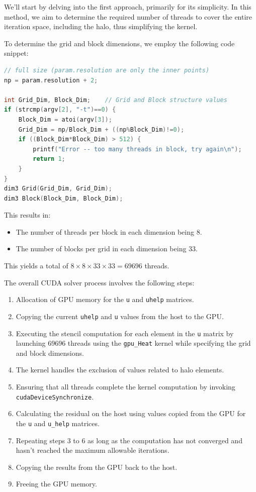 \documentclass[titlepage]{article}
\newcommand{\incode}[1]{\lstinline[style=inlineC,language=C]{#1}}
\begin{document}
We'll start by delving into the first approach, primarily for its simplicity. In this method, we aim to determine the required number of threads to cover the entire iteration space, including the halo, thus simplifying the kernel.

To determine the grid and block dimensions, we employ the following code snippet:

\begin{lstlisting}[style=c, language=C, caption=Grid and block dimension calculation, captionpos=b]
// full size (param.resolution are only the inner points)
np = param.resolution + 2;

int Grid_Dim, Block_Dim;    // Grid and Block structure values
if (strcmp(argv[2], "-t")==0) {
    Block_Dim = atoi(argv[3]);
    Grid_Dim = np/Block_Dim + ((np%Block_Dim)!=0);
    if ((Block_Dim*Block_Dim) > 512) {
        printf("Error -- too many threads in block, try again\n");
        return 1;
    }
}
dim3 Grid(Grid_Dim, Grid_Dim);
dim3 Block(Block_Dim, Block_Dim);
\end{lstlisting}

This results in:

\begin{itemize}
    \item The number of threads per block in each dimension being 8.
    \item The number of blocks per grid in each dimension being 33.
\end{itemize}

This yields a total of $8 \times 8 \times 33 \times 33 = 69696$ threads.

The overall CUDA solver process involves the following steps:

\begin{enumerate}
    \item Allocation of GPU memory for the \incode{u} and \incode{uhelp} matrices.
    \item Copying the current \incode{uhelp} and \incode{u} values from the host to the GPU.
    \item Executing the stencil computation for each element in the \incode{u} matrix by launching 69696 threads using the \incode{gpu_Heat} kernel while specifying the grid and block dimensions.
    \item The kernel handles the exclusion of values related to halo elements.
    \item Ensuring that all threads complete the kernel computation by invoking \incode{cudaDeviceSynchronize}.
    \item Calculating the residual on the host using values copied from the GPU for the \incode{u} and \incode{u_help} matrices.
    \item Repeating steps 3 to 6 as long as the computation has not converged and hasn't reached the maximum allowable iterations.
    \item Copying the results from the GPU back to the host.
    \item Freeing the GPU memory.
\end{enumerate}
\end{document}
